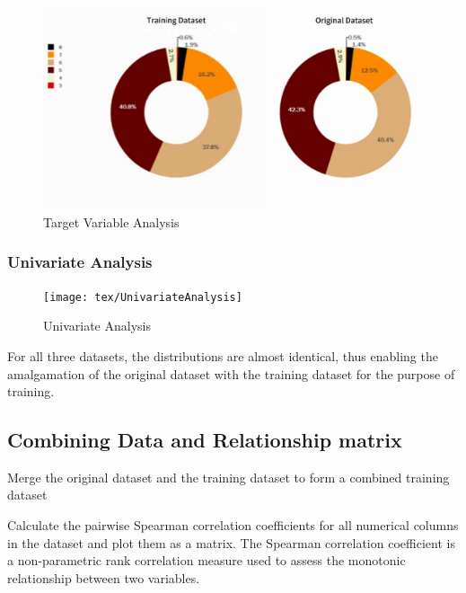 \begin{figure}[H]
	\centering
	\includegraphics[width=0.8\linewidth]{tex/TargetVariableAnalysis}
	\caption{Target Variable Analysis}
	\label{fig:targetvariableanalysis}
\end{figure}

\subsubsection{Univariate Analysis}\phantom{...}

\begin{figure}[H]
	\centering
	\texttt{[image: tex/UnivariateAnalysis]}
	\caption{Univariate Analysis}
	\label{fig:univariateanalysis}
\end{figure}

For all three datasets, the distributions are almost identical, thus enabling the amalgamation of the original dataset with the training dataset for the purpose of training.

\subsection{Combining Data and Relationship matrix}\phantom{...}

Merge the original dataset and the training dataset to form a combined training dataset

Calculate the pairwise Spearman correlation coefficients for all numerical columns in the dataset and plot them as a matrix. The Spearman correlation coefficient is a non-parametric rank correlation measure used to assess the monotonic relationship between two variables.

